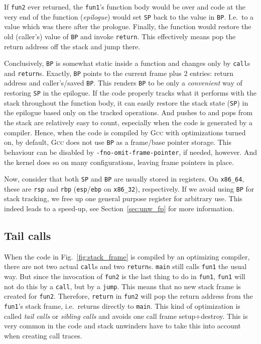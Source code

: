 \documentclass[10pt]{llncs}
\newcommand{\code}[2][]{\lstinline[columns=fullflexible, #1]$#2$}
\newcommand{\codeasm}[2][]{\code[language={[x86masm]Assembler},
	morekeywords={rbp,rsp},#1]{#2}}
\newcommand{\xesl}{\texttt{x86\_32}\xspace}
\newcommand{\xesh}{\texttt{x86\_64}\xspace}
\newcommand{\gcc}{\textsc{Gcc}\xspace}
\begin{document}
If \code{fun2} ever returned, the \code{fun1}'s function body would be over
and code at the very end of the function (\emph{epilogue}) would set \code{SP}
back to the value in \code{BP}. I.e.\ to a value which was there after the
prologue.  Finally, the function would restore the old (caller's) value of
\code{BP} and invoke \code{return}. This effectively means pop the return
address off the stack and jump there.

Conclusively, \code{BP} is somewhat static inside a function and changes only
by \codeasm{call}s and \code{return}s. Exactly, \code{BP} points to the
current frame plus 2 entries: return address and caller's/saved \code{BP}.
This renders \code{BP} to be only a \emph{convenient} way of restoring
\code{SP} in the epilogue.  If the code properly tracks what it performs with
the stack throughout
the function body, it can easily restore the stack state (\code{SP}) in the
epilogue based only on the tracked operations.  And pushes to and pops from
the stack are relatively easy to count, especially when the code is generated
by a compiler. Hence, when the code is compiled by \gcc with optimizations
turned on, by default, \gcc does not use \code{BP} as a frame/base pointer
storage.  This behaviour can be disabled by \code{-fno-omit-frame-pointer}, if
needed, however. And the kernel does so on many configurations,
leaving frame pointers in place.

Now, consider that both \code{SP} and \code{BP} are usually stored in
registers. On \xesh, these are \codeasm{rsp} and \codeasm{rbp}
(\codeasm{esp}/\codeasm{ebp} on \xesl), respectively. If we avoid using
\code{BP} for stack tracking, we free up one general purpose register for
arbitrary use.  This indeed leads to a speed-up, see
Section~\ref{sec:unw_fp} for more information.

\subsection{Tail calls} \label{sec:tail_calls}
When the code in Fig.~\ref{fig:stack_frame} is compiled by an optimizing
compiler, there are not two actual \codeasm{call}s and two \code{return}s.
\code{main} still calls \code{fun1} the usual way. But since the invocation of
\code{fun2} is the last thing to do in \code{fun1}, \code{fun1} will not do
this by a \codeasm{call}, but by a \code[morekeywords=jump]{jump}. This means
that no new stack frame is created for \code{fun2}. Therefore, \code{return}
in \code{fun2} will pop the return address from the \code{fun1}'s stack frame,
i.e.\ returns directly to \code{main}. This kind of optimization is called
\textit{tail calls} or \textit{sibling calls} and avoids one call frame
setup+destroy.  This is very common in the code and stack unwinders have to
take this into account when creating call traces.
\end{document}
